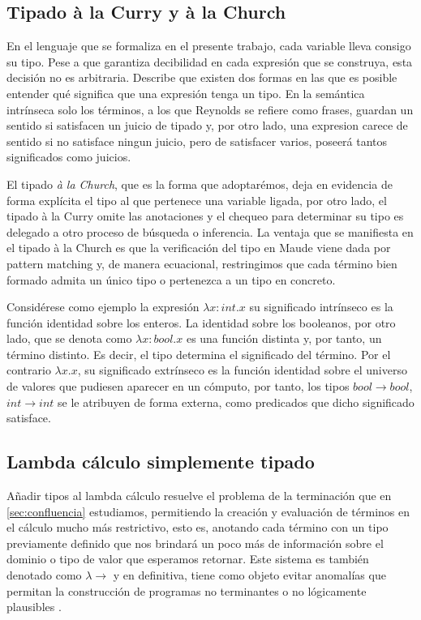 \subsection{Tipado à la Curry y à la Church}
En el lenguaje que se formaliza en el presente trabajo, cada variable lleva consigo su tipo. Pese a que garantiza decibilidad en cada expresión que se construya, esta decisión no es arbitraria. Describe \cite{reynolds2000} que existen dos formas en las que es posible entender qué significa que una expresión tenga un tipo. En la semántica intrínseca solo los términos, a los que Reynolds se refiere como frases, guardan un sentido si satisfacen un juicio de tipado y, por otro lado, una expresion carece de sentido si no satisface ningun juicio, pero de satisfacer varios, poseerá tantos significados como juicios.

El tipado \textit{à la Church}, que es la forma que adoptarémos, deja en evidencia de forma explícita el tipo al que pertenece una variable ligada, por otro lado, el tipado à la Curry omite las anotaciones y el chequeo para determinar su tipo es delegado a otro proceso de búsqueda o inferencia. La ventaja que se manifiesta en el tipado à la Church es que la verificación del tipo en Maude viene dada por pattern matching y, de manera ecuacional, restringimos que cada término bien formado admita un único tipo o pertenezca a un tipo en concreto.

Considérese como ejemplo la expresión $\lambda x : int . x $ su significado intrínseco es la función identidad sobre los enteros. La identidad sobre los booleanos, por otro lado, que se denota como $\lambda x : bool . x$ es una función distinta y, por tanto, un término distinto. Es decir, el tipo determina el significado del término. Por el contrario $\lambda x . x$, su significado extrínseco es la función identidad sobre el universo de valores que pudiesen aparecer en un cómputo, por tanto, los tipos $bool \to bool$, $int \to int$ se le atribuyen de forma externa, como predicados que dicho significado satisface.


\subsection{Lambda cálculo simplemente tipado}
Añadir tipos al lambda cálculo resuelve el problema de la terminación que en \cref{sec:confluencia} estudiamos, permitiendo la creación y evaluación de términos en el cálculo mucho más restrictivo, esto es, anotando cada término con un tipo previamente definido que nos brindará un poco más de información sobre el dominio o tipo de valor que esperamos retornar. Este sistema es también denotado como $\lambda\to$ y en definitiva, tiene como objeto evitar anomalías que permitan la construcción de programas no terminantes o no lógicamente plausibles \citep{geuvers2014}.

